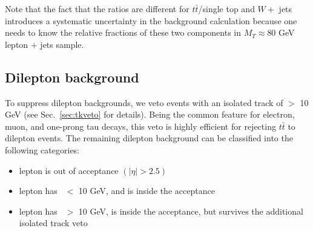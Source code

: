 Note that the fact that the ratios are different for 
$t\bar{t}$/single top and $W +$ jets introduces a systematic
uncertainty in the background calculation because one needs
to know the relative fractions of these two components in 
$M_T \approx 80$ GeV lepton $+$ jets sample.


\subsection{Dilepton background}
\label{sec:dil-general}

To suppress dilepton backgrounds, we veto events with an isolated track of \pt $>$ 10 GeV (see Sec.~\ref{sec:tkveto} for details). 
Being the common feature for electron, muon, and one-prong
tau decays, this veto is highly efficient for rejecting 
$t\bar{t}$ to dilepton events. The remaining dilepton background can be classified into the following categories:

\begin{itemize}
\item lepton is out of acceptance $(|\eta| > 2.5)$
\item lepton has \pt\ $<$ 10 GeV, and is inside the acceptance
\item lepton has \pt\ $>$ 10 GeV, is inside the acceptance, but survives the additional isolated track veto
\end{itemize}


